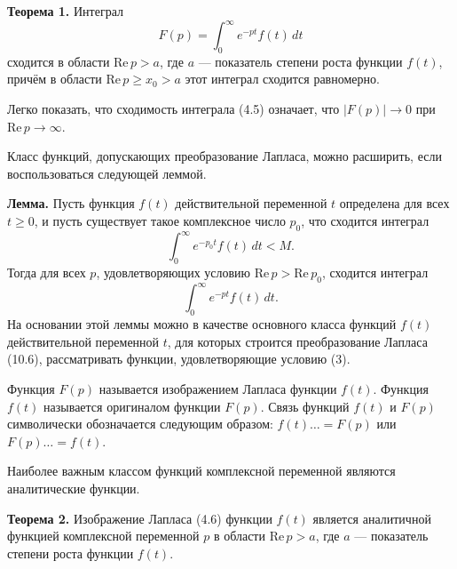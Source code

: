 {\textbf{Теорема 1.} Интеграл 
\[
F(p) = \int_0^{\infty} e^{-pt} f(t) \, dt \tag{4.5}
\]
сходится в области \( \text{Re} \, p > a \), где \( a \) — показатель степени роста функции \( f(t) \), причём в области \( \text{Re} \, p \geq x_0 > a \) этот интеграл сходится равномерно.

Легко показать, что сходимость интеграла (4.5) означает, что \( |F(p)| \to 0 \) при \( \text{Re} \, p \to \infty \). 

Класс функций, допускающих преобразование Лапласа, можно расширить, если воспользоваться следующей леммой.

\textbf{Лемма.} Пусть функция \( f(t) \) действительной переменной \( t \) определена для всех \( t \geq 0 \), и пусть существует такое комплексное число \( p_0 \), что сходится интеграл
\[
\int_0^{\infty} e^{-p_0 t} f(t) \, dt < M. \tag{4.6}
\]
Тогда для всех \( p \), удовлетворяющих условию \( \text{Re} \, p > \text{Re} \, p_0 \), сходится интеграл
\[
\int_0^{\infty} e^{-pt} f(t) \, dt.  \tag{4.7}
\]
На основании этой леммы можно в качестве основного класса функций \( f(t) \) действительной переменной \( t \), для которых строится преобразование Лапласа (10.6), рассматривать функции, удовлетворяющие условию (3).

Функция \( F(p) \) называется изображением Лапласа функции \( f(t) \). Функция \( f(t) \) называется оригиналом функции \( F(p) \). Связь функций \( f(t) \) и \( F(p) \) символически обозначается следующим образом: \( f(t) \dots = F(p) \) или \( F(p) \dots = f(t) \).

Наиболее важным классом функций комплексной переменной являются аналитические функции.

\textbf{Теорема 2.} Изображение Лапласа (4.6) функции \( f(t) \) является аналитичной функцией комплексной переменной \( p \) в области \( \text{Re} \, p > a \), где \( a \) — показатель степени роста функции \( f(t) \).

}

